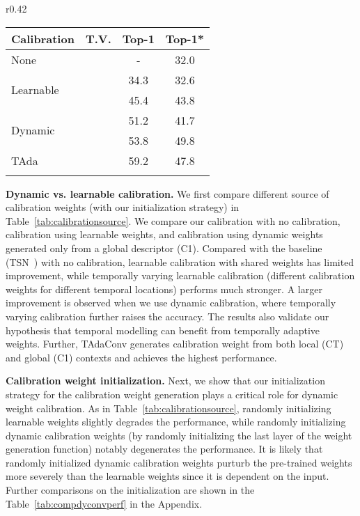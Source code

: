 \documentclass{article} \usepackage{iclr2022_conference,times}
\newcommand{\cmark}{\color{forestgreen}\ding{51}}\newcommand{\xmark}{\color{red}\ding{55}}\usepackage{pifont}
\newcommand{\tablestyle}[2]{\setlength{\tabcolsep}{#1}\renewcommand{\arraystretch}{#2}\centering\small}
\def\x{}
\begin{document}
\begin{wraptable}[9]{r}{0.42\textwidth}
\tablestyle{6pt}{1.0}
\vspace{-1.5em}
\caption{Benefit of dynamic calibration. \textit{T.V.:} temporally varying. \textit{*}: w/o our init.}
\vspace{-1em}
\centering

    \begin{tabular}{lccc}
		\shline
\bf Calibration & \bf  T.V.  & \bf  Top-1 & \bf Top-1* \\
\hline
 None & \xmark & - & {32.0}\\
\hline
\multirow{2}{*}{Learnable} & \xmark & 34.3 & 32.6 \\
~ & \cmark & 45.4 & 43.8 \\
\hline
\multirow{2}{*}{Dynamic} & \xmark & 51.2 & 41.7 \\
~ & \cmark & 53.8 & 49.8 \\
\hline
TAda & \cmark & 59.2 & 47.8 \\
\shline
	\end{tabular}
	\label{tab:calibrationsource}
	\vspace{1mm}
\end{wraptable}
\textbf{Dynamic vs. learnable calibration.} We first compare different source of calibration weights (with our initialization strategy) in Table~\ref{tab:calibrationsource}. 
We compare our calibration with no calibration, calibration using learnable weights, and calibration using dynamic weights generated only from a global descriptor (C\x1).
Compared with the baseline (TSN~\citep{tsn}) with no calibration, learnable calibration with shared weights has limited improvement, while temporally varying learnable calibration (different calibration weights for different temporal locations) performs much stronger. 
A larger improvement is observed when we use dynamic calibration, where temporally varying calibration further raises the accuracy.
The results also validate our hypothesis that temporal modelling can benefit from temporally adaptive weights. 
Further, TAdaConv generates calibration weight from both local (C\x T) and global (C\x1) contexts and achieves the highest performance. 

\textbf{Calibration weight initialization.} Next, we show that our initialization strategy for the calibration weight generation plays a critical role for dynamic weight calibration.
As in Table~\ref{tab:calibrationsource}, randomly initializing learnable weights slightly degrades the performance, while randomly initializing dynamic calibration weights (by randomly initializing the last layer of the weight generation function) notably degenerates the performance. 
It is likely that randomly initialized dynamic calibration weights purturb the pre-trained weights more severely than the learnable weights since it is dependent on the input.
Further comparisons on the initialization are shown in the Table~\ref{tab:compdyconvperf} in the Appendix.
\end{document}
